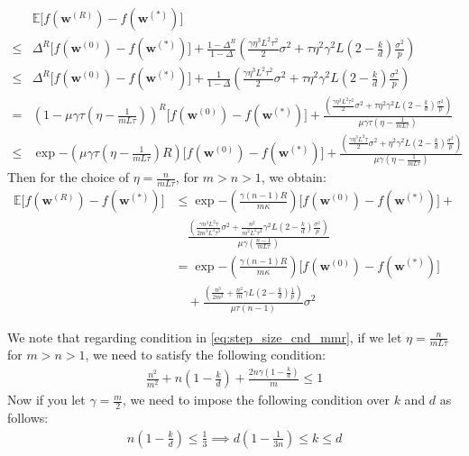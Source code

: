 \documentclass[review,onefignum,onetabnum]{siamart190516}
\begin{document}
\begin{align}
            &\mathbb{E}\Big[f({\boldsymbol{w}}^{(R)})-f({\boldsymbol{w}}^{(*)})\Big]\\
            \leq &\Delta^R \Big[f({\boldsymbol{w}}^{(0)})-f({\boldsymbol{w}}^{(*)})\Big]+\frac{1-\Delta^R}{1-\Delta}\left(\frac{\gamma\eta^3L^2\tau^2}{2}\sigma^2+\tau\eta^2\gamma^2 L\left(2-\frac{k}{d}\right)\frac{\sigma^2}{p} \right)\nonumber\\
            \leq & \Delta^R \Big[f({\boldsymbol{w}}^{(0)})-f({\boldsymbol{w}}^{(*)})\Big]+\frac{1}{1-\Delta}\left(\frac{\gamma\eta^3L^2\tau^2}{2}\sigma^2+\tau\eta^2\gamma^2 L\left(2-\frac{k}{d}\right)\frac{\sigma^2}{p} \right)\nonumber\\
            =& {\left(1-\mu\gamma\tau\left(\eta-\frac{1}{mL\tau}\right)\right)}^R \Big[f({\boldsymbol{w}}^{(0)})-f({\boldsymbol{w}}^{(*)})\Big]+\frac{\left(\frac{\gamma\eta^3L^2\tau^2}{2}\sigma^2+\tau\eta^2\gamma^2 L\left(2-\frac{k}{d}\right)\frac{\sigma^2}{p} \right)}{\mu\gamma\tau\left(\eta-\frac{1}{m L\tau}\right)}\nonumber\\
            \leq &\exp{-\left(\mu\gamma\tau\left(\eta-\frac{1}{m L\tau}\right)R\right)}\Big[f({\boldsymbol{w}}^{(0)})-f({\boldsymbol{w}}^{(*)})\Big]+\frac{\left(\frac{\gamma\eta^3L^2\tau}{2}\sigma^2+\eta^2\gamma^2 L\left(2-\frac{k}{d}\right)\frac{\sigma^2}{p} \right)}{\mu\gamma\left(\eta-\frac{1}{mL\tau}\right)}
\end{align}
Then for the choice of $\eta=\frac{n}{mL\tau}$, for $m>n>1$, we obtain:
\begin{align}
                \mathbb{E}\Big[f({\boldsymbol{w}}^{(R)})-f({\boldsymbol{w}}^{(*)})\Big]&\leq \exp{-\left(\frac{\gamma\left(n-1\right) R}{m\kappa}\right) }\Big[f({\boldsymbol{w}}^{(0)})-f({\boldsymbol{w}}^{(*)})\Big]+\\
                &\quad \frac{\left(\frac{\gamma n^3L^2\tau}{2m^3L^3\tau^3}\sigma^2+\frac{n^2}{m^2L^2\tau^2}\gamma^2 L\left(2-\frac{k}{d}\right)\frac{\sigma^2}{p} \right)}{\mu\gamma\left(\frac{n-1}{mL\tau}\right)}\nonumber\\
                &=\exp{-\left(\frac{\gamma\left(n-1\right) R}{m\kappa}\right) }\Big[f({\boldsymbol{w}}^{(0)})-f({\boldsymbol{w}}^{(*)})\Big]\\
                & \quad+\frac{\left(\frac{ n^3}{2m^2}+\frac{n^2}{m}\gamma L\left(2-\frac{k}{d}\right)\frac{1}{p} \right)}{\mu\tau\left(n-1\right)}\sigma^2
\end{align}

We note that regarding condition in \eqref{eq:step_size_cnd_mmr}, if we let $\eta=\frac{n}{m L\tau}$ for $m>n>1$, we need to satisfy the following condition:
\begin{align}
    \frac{n^2}{m^2}+n\left(1-\frac{k}{d}\right)+\frac{2n\gamma\left(1-\frac{k}{d}\right)}{m}\leq 1
\end{align}
Now if you let $\gamma=\frac{m}{2}$, we need to impose the following condition over $k$ and $d$ as follows:
\begin{align}
    n\left(1-\frac{k}{d}\right)\leq \frac{1}{3}\implies d\left(1-\frac{1}{3n}\right)\leq k\leq d
\end{align}
\end{document}
